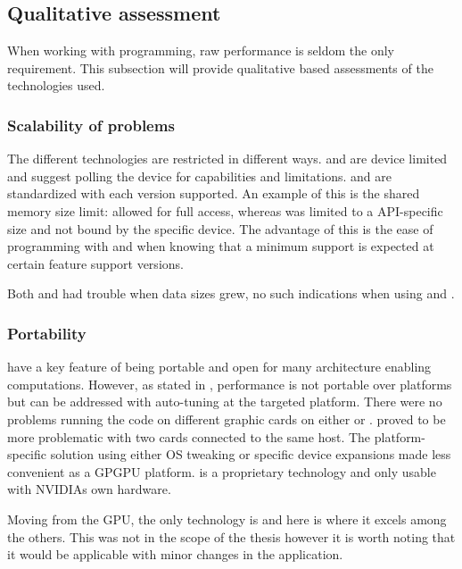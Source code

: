 \subsection{Qualitative assessment}

When working with programming, raw performance is seldom the only requirement. This subsection will provide qualitative based assessments of the technologies used.

\subsubsection{Scalability of problems}

The different technologies are restricted in different ways. {\CU} and {\OCL} are device limited and suggest polling the device for capabilities and limitations. {\DX} and {\GL} are standardized with each version supported. An example of this is the shared memory size limit: {\CU} allowed for full access, whereas {\DX} was limited to a \gls{API}-specific size and not bound by the specific device. The advantage of this is the ease of programming with {\DX} and {\GL} when knowing that a minimum support is expected at certain feature support versions.

Both {\DX} and {\GL} had trouble when data sizes grew, no such indications when using {\CU} and {\OCL}.

\subsubsection{Portability}

{\OCL} have a key feature of being portable and open for many architecture enabling computations. However, as stated in \cite{fang2011comprehensive, du2012cuda}, performance is not portable over platforms but can be addressed with auto-tuning at the targeted platform. There were no problems running the code on different graphic cards on either {\OCL} or {\DX}. {\GL} proved to be more problematic with two cards connected to the same host. The platform-specific solution using either \gls{OS} tweaking or specific device {\GL} expansions made {\GL} less convenient as a GPGPU platform. {\CU} is a proprietary technology and only usable with NVIDIAs own hardware.

Moving from the \gls{GPU}, the only technology is {\OCL} and here is where it excels among the others. This was not in the scope of the thesis however it is worth noting that it would be applicable with minor changes in the application.


